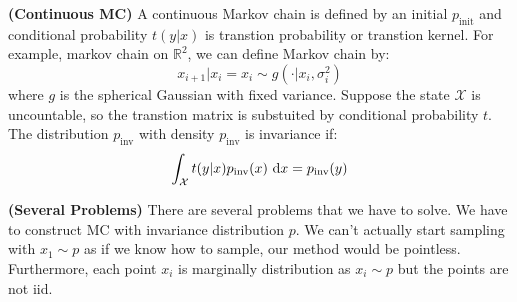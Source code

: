 \begin{definition}{\textbf{(Continuous MC)}}
    A continuous Markov chain is defined by an initial $p_\text{init}$ and conditional probability $t(y|x)$ is transtion probability or transtion kernel. For example, markov chain on $\mathbb{R}^2$, we can define Markov chain by:
    \begin{equation*}
        x_{i+1}|x_i = x_i \sim g(\cdot | x_i,\sigma^2_i)
    \end{equation*}
    where $g$ is the spherical Gaussian with fixed variance. Suppose the state $\mathcal{X}$ is uncountable, so the transtion matrix is substuited by conditional probability $t$. The distribution $p_\text{inv}$ with density $p_\text{inv}$ is invariance if:
    \begin{equation*}
        \int_\mathcal{X} t(y|x)p_\text{inv}(x)\ \mathrm{d} x = p_\text{inv}(y)
    \end{equation*}
\end{definition}

\begin{remark}{\textbf{(Several Problems)}}
    There are several problems that we have to solve. We have to construct MC with invariance distribution $p$. We can't actually start sampling with $x_1\sim p$ as if we know how to sample, our method would be pointless. Furthermore, each point $x_i$ is marginally distribution as $x_i\sim p$ but the points are not iid. 
\end{remark}

